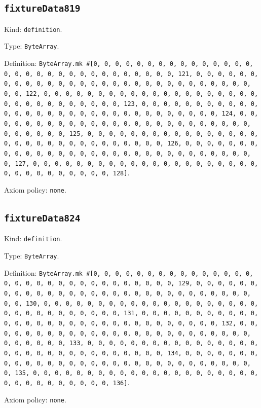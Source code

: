 \documentclass[11pt]{article}
\begin{document}
\subsection*{\texttt{fixtureData819}}
\noindent Kind: \texttt{definition}.\par
\noindent Type: \texttt{ByteArray}.\par
\noindent Definition: \texttt{ByteArray.mk \#[0, 0, 0, 0, 0, 0, 0, 0, 0, 0, 0, 0, 0, 0, 0, 0, 0, 0, 0, 0, 0, 0, 0, 0, 0, 0, 0, 0, 0, 0, 0, 121, 0, 0, 0, 0, 0, 0, 0, 0, 0, 0, 0, 0, 0, 0, 0, 0, 0, 0, 0, 0, 0, 0, 0, 0, 0, 0, 0, 0, 0, 0, 0, 122, 0, 0, 0, 0, 0, 0, 0, 0, 0, 0, 0, 0, 0, 0, 0, 0, 0, 0, 0, 0, 0, 0, 0, 0, 0, 0, 0, 0, 0, 0, 0, 123, 0, 0, 0, 0, 0, 0, 0, 0, 0, 0, 0, 0, 0, 0, 0, 0, 0, 0, 0, 0, 0, 0, 0, 0, 0, 0, 0, 0, 0, 0, 0, 124, 0, 0, 0, 0, 0, 0, 0, 0, 0, 0, 0, 0, 0, 0, 0, 0, 0, 0, 0, 0, 0, 0, 0, 0, 0, 0, 0, 0, 0, 0, 0, 125, 0, 0, 0, 0, 0, 0, 0, 0, 0, 0, 0, 0, 0, 0, 0, 0, 0, 0, 0, 0, 0, 0, 0, 0, 0, 0, 0, 0, 0, 0, 0, 126, 0, 0, 0, 0, 0, 0, 0, 0, 0, 0, 0, 0, 0, 0, 0, 0, 0, 0, 0, 0, 0, 0, 0, 0, 0, 0, 0, 0, 0, 0, 0, 127, 0, 0, 0, 0, 0, 0, 0, 0, 0, 0, 0, 0, 0, 0, 0, 0, 0, 0, 0, 0, 0, 0, 0, 0, 0, 0, 0, 0, 0, 0, 0, 128]}.\par
\noindent Axiom policy: \texttt{none}.\par
\subsection*{\texttt{fixtureData824}}
\noindent Kind: \texttt{definition}.\par
\noindent Type: \texttt{ByteArray}.\par
\noindent Definition: \texttt{ByteArray.mk \#[0, 0, 0, 0, 0, 0, 0, 0, 0, 0, 0, 0, 0, 0, 0, 0, 0, 0, 0, 0, 0, 0, 0, 0, 0, 0, 0, 0, 0, 0, 0, 129, 0, 0, 0, 0, 0, 0, 0, 0, 0, 0, 0, 0, 0, 0, 0, 0, 0, 0, 0, 0, 0, 0, 0, 0, 0, 0, 0, 0, 0, 0, 0, 130, 0, 0, 0, 0, 0, 0, 0, 0, 0, 0, 0, 0, 0, 0, 0, 0, 0, 0, 0, 0, 0, 0, 0, 0, 0, 0, 0, 0, 0, 0, 0, 131, 0, 0, 0, 0, 0, 0, 0, 0, 0, 0, 0, 0, 0, 0, 0, 0, 0, 0, 0, 0, 0, 0, 0, 0, 0, 0, 0, 0, 0, 0, 0, 132, 0, 0, 0, 0, 0, 0, 0, 0, 0, 0, 0, 0, 0, 0, 0, 0, 0, 0, 0, 0, 0, 0, 0, 0, 0, 0, 0, 0, 0, 0, 0, 133, 0, 0, 0, 0, 0, 0, 0, 0, 0, 0, 0, 0, 0, 0, 0, 0, 0, 0, 0, 0, 0, 0, 0, 0, 0, 0, 0, 0, 0, 0, 0, 134, 0, 0, 0, 0, 0, 0, 0, 0, 0, 0, 0, 0, 0, 0, 0, 0, 0, 0, 0, 0, 0, 0, 0, 0, 0, 0, 0, 0, 0, 0, 0, 135, 0, 0, 0, 0, 0, 0, 0, 0, 0, 0, 0, 0, 0, 0, 0, 0, 0, 0, 0, 0, 0, 0, 0, 0, 0, 0, 0, 0, 0, 0, 0, 136]}.\par
\noindent Axiom policy: \texttt{none}.\par
\end{document}
